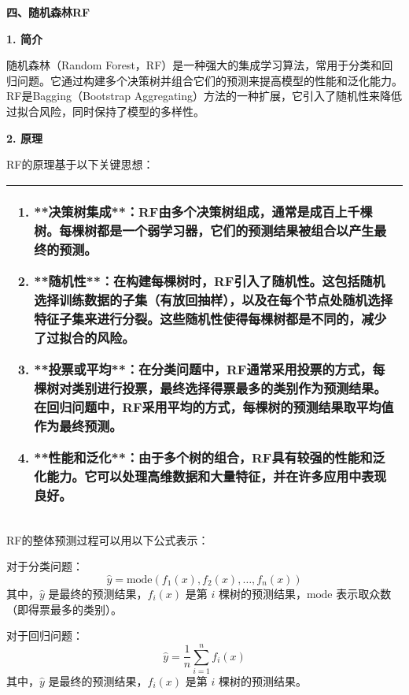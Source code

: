 \documentclass[bwprint]{gmcmthesis}
\begin{document}
				\textbf{四、随机森林RF}
				
				\textbf{1. 简介}
				
				随机森林（Random Forest，RF）是一种强大的集成学习算法，常用于分类和回归问题。它通过构建多个决策树并组合它们的预测来提高模型的性能和泛化能力。RF是Bagging（Bootstrap Aggregating）方法的一种扩展，它引入了随机性来降低过拟合风险，同时保持了模型的多样性。
				
				\textbf{2. 原理}
				
				RF的原理基于以下关键思想：
				
				\begin{table}[H]
					\centering
					\begin{tabularx}{\textwidth}{|X|}
					\hline
					\begin{enumerate}
						\item **决策树集成**：RF由多个决策树组成，通常是成百上千棵树。每棵树都是一个弱学习器，它们的预测结果被组合以产生最终的预测。
						
						\item **随机性**：在构建每棵树时，RF引入了随机性。这包括随机选择训练数据的子集（有放回抽样），以及在每个节点处随机选择特征子集来进行分裂。这些随机性使得每棵树都是不同的，减少了过拟合的风险。
						
						\item **投票或平均**：在分类问题中，RF通常采用投票的方式，每棵树对类别进行投票，最终选择得票最多的类别作为预测结果。在回归问题中，RF采用平均的方式，每棵树的预测结果取平均值作为最终预测。
						
						\item **性能和泛化**：由于多个树的组合，RF具有较强的性能和泛化能力。它可以处理高维数据和大量特征，并在许多应用中表现良好。
						
					\end{enumerate}\\
					\hline
				\end{tabularx}
				\end{table}
				
				RF的整体预测过程可以用以下公式表示：
				
				对于分类问题：
				\[
				\hat{y} = \text{mode}(f_1(x), f_2(x), \ldots, f_n(x))
				\]
				其中，$\hat{y}$ 是最终的预测结果，$f_i(x)$ 是第 $i$ 棵树的预测结果，$\text{mode}$ 表示取众数（即得票最多的类别）。
				
				对于回归问题：
				\[
				\hat{y} = \frac{1}{n}\sum_{i=1}^{n} f_i(x)
				\]
				其中，$\hat{y}$ 是最终的预测结果，$f_i(x)$ 是第 $i$ 棵树的预测结果。
				
\end{document}
